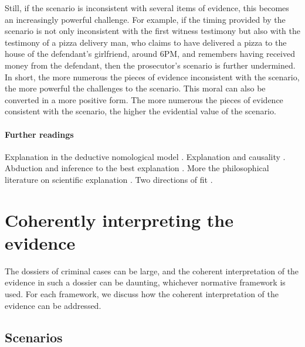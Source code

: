 \documentclass[10pt]{article}
\begin{document}
Still, if the scenario is inconsistent with several items of evidence, this becomes an increasingly powerful challenge. 
For example, if the timing provided by the scenario is not only inconsistent 
with the first witness testimony but also with the testimony of a pizza delivery man, 
who claims to have delivered a pizza to the house of the defendant's girlfriend, around 6PM, and remembers having received money 
from the defendant, then the prosecutor's scenario is further undermined. In short, the more numerous the pieces of evidence 
inconsistent with the scenario, the more powerful the challenges to the scenario.
This moral can also be converted in a more positive form. The more numerous the pieces of evidence consistent with the scenario, 
the higher the evidential value of the scenario.







\paragraph{Further readings}

Explanation in the deductive nomological model \citep{hempelOppenhaim1948}. 
Explanation and causality \citep{salmon1984}. 
Abduction and inference to the best explanation \citep{lipton1991}.
More the philosophical literature on 
scientific explanation \citep{woodward2014}. 
Two directions of fit \citep{wells1992}.


\section{Coherently interpreting the evidence}
\label{sec:cohint}

The dossiers of criminal cases can be large, and the coherent interpretation of the evidence in such a dossier can 
be daunting, whichever normative framework is used. For each framework, we discuss how the coherent 
interpretation of the evidence can be addressed.

\subsection{Scenarios}
\end{document}
